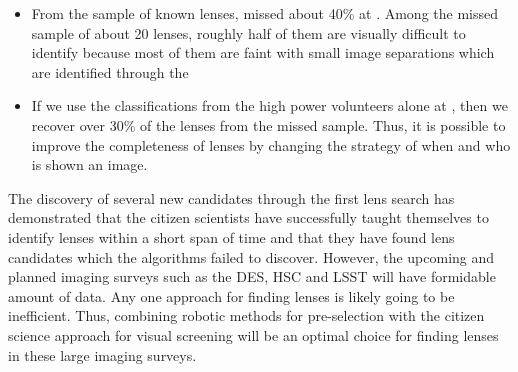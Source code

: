 \documentclass[useAMS,usenatbib,a4paper]{mn2e}
\begin{document}
\begin{itemize}
\item From the sample of known lenses, \sw missed about 40\% at \StageOne.
Among the missed sample of about 20 lenses, roughly half of them are
visually difficult to identify because most of them are faint with small
image separations which are identified through the \rf

\item If we use the classifications from the high power volunteers alone
at \StageOne, then we recover over 30\% of the lenses from the missed
sample. Thus, it is possible to improve the completeness of lenses by
changing the strategy of when and who is shown an image.

\end{itemize}

The discovery of several new candidates through the first \sw lens
search has demonstrated that the citizen scientists have successfully
taught themselves to identify lenses within a short span of time and
that they have found lens candidates which the algorithms failed to
discover.  However, the upcoming and planned imaging surveys such as the
DES, HSC and LSST will have formidable amount of data. Any one approach
for finding lenses is likely going to be inefficient. Thus, combining
robotic methods for pre-selection with the citizen science approach for
visual screening will be an optimal choice for finding lenses in these
large imaging surveys.
\end{document}
